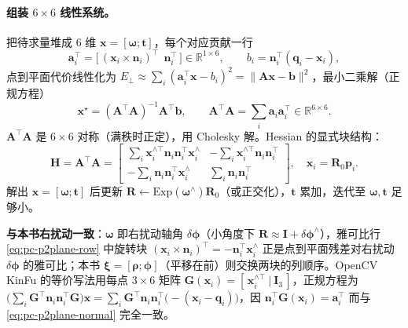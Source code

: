 \paragraph{组装 $6\times6$ 线性系统。}
把待求量堆成 $6$ 维 $\mathbf{x}=[\boldsymbol{\omega};\mathbf{t}]$，每个对应贡献一行
\begin{equation}
  \mathbf{a}_i^\top=\big[\,(\mathbf{x}_i\times\mathbf{n}_i)^\top\ \ \mathbf{n}_i^\top\,\big]\in\mathbb{R}^{1\times6},
  \qquad b_i=\mathbf{n}_i^\top(\mathbf{q}_i-\mathbf{x}_i),
  \label{eq:pc-p2plane-row}
\end{equation}
点到平面代价线性化为 $E_\perp\approx\sum_i(\mathbf{a}_i^\top\mathbf{x}-b_i)^2=\|\mathbf{A}\mathbf{x}-\mathbf{b}\|^2$，最小二乘解（正规方程）
\begin{equation}
  \mathbf{x}^\star=(\mathbf{A}^\top\mathbf{A})^{-1}\mathbf{A}^\top\mathbf{b},\qquad
  \mathbf{A}^\top\mathbf{A}=\sum_i\mathbf{a}_i\mathbf{a}_i^\top\in\mathbb{R}^{6\times6}.
  \label{eq:pc-p2plane-normal}
\end{equation}
$\mathbf{A}^\top\mathbf{A}$ 是 $6\times6$ 对称（满秩时正定），用 Cholesky 解。Hessian 的显式块结构：
\begin{equation}
  \mathbf{H}=\mathbf{A}^\top\mathbf{A}=\begin{bmatrix}
  \displaystyle\sum_i\mathbf{x}_i^{\wedge\top}\mathbf{n}_i\mathbf{n}_i^\top\mathbf{x}_i^\wedge & -\displaystyle\sum_i\mathbf{x}_i^{\wedge\top}\mathbf{n}_i\mathbf{n}_i^\top\\[10pt]
  -\displaystyle\sum_i\mathbf{n}_i\mathbf{n}_i^\top\mathbf{x}_i^\wedge & \displaystyle\sum_i\mathbf{n}_i\mathbf{n}_i^\top
  \end{bmatrix},\quad \mathbf{x}_i=\mathbf{R}_0\mathbf{p}_i.
  \label{eq:pc-p2plane-hessian}
\end{equation}
解出 $\mathbf{x}=[\boldsymbol{\omega};\mathbf{t}]$ 后更新 $\mathbf{R}\leftarrow\mathrm{Exp}(\boldsymbol{\omega}^\wedge)\mathbf{R}_0$（或正交化），$\mathbf{t}$ 累加，迭代至 $\boldsymbol{\omega},\mathbf{t}$ 足够小。

\begin{note}
\textbf{与本书右扰动一致}：$\boldsymbol{\omega}$ 即右扰动轴角 $\delta\boldsymbol{\phi}$（小角度下 $\mathbf{R}\approx\mathbf{I}+\delta\boldsymbol{\phi}^\wedge$），雅可比行 \cref{eq:pc-p2plane-row} 中旋转块 $(\mathbf{x}_i\times\mathbf{n}_i)^\top=-\mathbf{n}_i^\top\mathbf{x}_i^\wedge$ 正是点到平面残差对右扰动 $\delta\boldsymbol{\phi}$ 的雅可比；本书 $\boldsymbol{\xi}=[\boldsymbol{\rho};\boldsymbol{\phi}]$（平移在前）则交换两块的列顺序。OpenCV KinFu 的等价写法用每点 $3\times6$ 矩阵 $\mathbf{G}(\mathbf{x}_i)=[\,\mathbf{x}_i^{\wedge\top}\ |\ \mathbf{I}_3\,]$，正规方程为 $\big(\sum_i\mathbf{G}^\top\mathbf{n}_i\mathbf{n}_i^\top\mathbf{G}\big)\mathbf{x}=\sum_i\mathbf{G}^\top\mathbf{n}_i\mathbf{n}_i^\top\big(-(\mathbf{x}_i-\mathbf{q}_i)\big)$，因 $\mathbf{n}_i^\top\mathbf{G}(\mathbf{x}_i)=\mathbf{a}_i^\top$ 而与 \cref{eq:pc-p2plane-normal} 完全一致。
\end{note}

